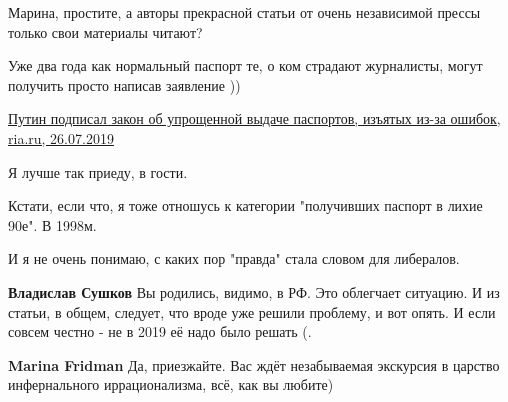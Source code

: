 \begin{itemize}
\begin{itemize}
Марина, простите, а авторы прекрасной статьи от очень независимой прессы только свои материалы читают?

Уже два года как нормальный паспорт те, о ком страдают журналисты, могут получить просто написав заявление ))

\href{https://ria.ru/20190726/1556917721.html}{%
Путин подписал закон об упрощенной выдаче паспортов, изъятых из-за ошибок, ria.ru, 26.07.2019%
}

 
Я лучше так приеду, в гости.

 
Кстати, если что, я тоже отношусь к категории "получивших паспорт в лихие 90е". В 1998м.

 
И я не очень понимаю, с каких пор "правда" стала словом для либералов.

 
\textbf{Владислав Сушков} Вы родились, видимо, в РФ. Это облегчает ситуацию. И из статьи, в общем, следует, что вроде уже решили проблему, и вот опять. И если совсем честно - не в 2019 её надо было решать (.

 
\textbf{Marina Fridman} Да, приезжайте. Вас ждёт незабываемая экскурсия в царство инфернального иррационализма, всё, как вы любите)


\end{itemize}
\end{itemize}
